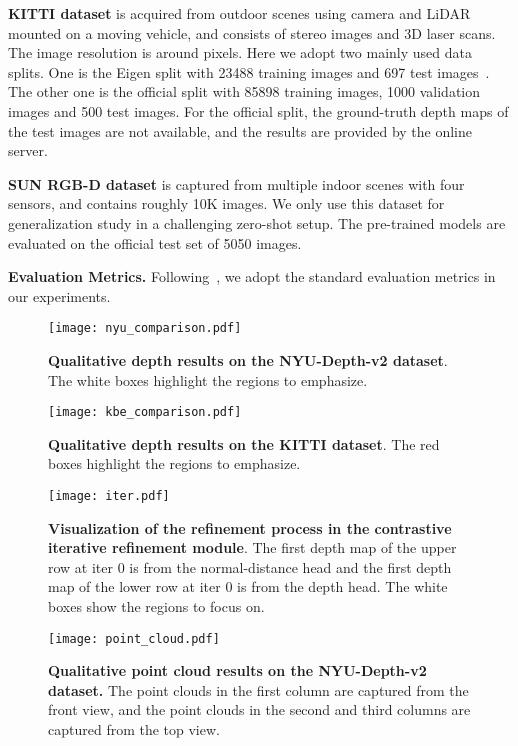 \documentclass[10pt,twocolumn,letterpaper]{article}
\begin{document}
\textbf{KITTI dataset} is acquired from outdoor scenes using camera and LiDAR mounted on a moving vehicle, and consists of stereo images and 3D laser scans. The image resolution is around  pixels. Here we adopt two mainly used data splits. One is the Eigen split with 23488 training images and 697 test images~\cite{eigen2014depth}. The other one is the official split with 85898 training images, 1000 validation images and 500 test images. For the official split, the ground-truth depth maps of the test images are not available, and the results are provided by the online server.

\textbf{SUN RGB-D dataset} is captured from multiple indoor scenes with four sensors, and contains roughly 10K images. We only use this dataset for generalization study in a challenging zero-shot setup. The pre-trained models are evaluated on the official test set of 5050 images.

\textbf{Evaluation Metrics.} Following~\cite{Yuan_2022_CVPR}, we adopt the standard evaluation metrics in our experiments.

\begin{figure*}[!htb]
\centering
\texttt{[image: nyu\_comparison.pdf]}\caption{\textbf{Qualitative depth results on the NYU-Depth-v2 dataset}. The white boxes highlight the regions to emphasize. }
\label{Fig6}
\end{figure*}

\begin{figure*}[!htb]
\centering
\texttt{[image: kbe\_comparison.pdf]}\caption{\textbf{Qualitative depth results on the KITTI dataset}. The red boxes highlight the regions to emphasize. }
\label{Fig5}
\end{figure*}

\begin{figure}[!htb]
\centering
\texttt{[image: iter.pdf]}\caption{\textbf{Visualization of the refinement process in the contrastive iterative refinement module}. The first depth map of the upper row at iter 0 is from the normal-distance head and the first depth map of the lower row at iter 0 is from the depth head. The white boxes show the regions to focus on.}
\label{Fig7}
\end{figure}

\begin{figure}[!htb]
\centering
\texttt{[image: point\_cloud.pdf]}\caption{\textbf{Qualitative point cloud results on the NYU-Depth-v2 dataset.} The point clouds in the first column are captured from the front view, and the point clouds in the second and third columns are captured from the top view. }
\label{Fig8}
\end{figure}
\end{document}
